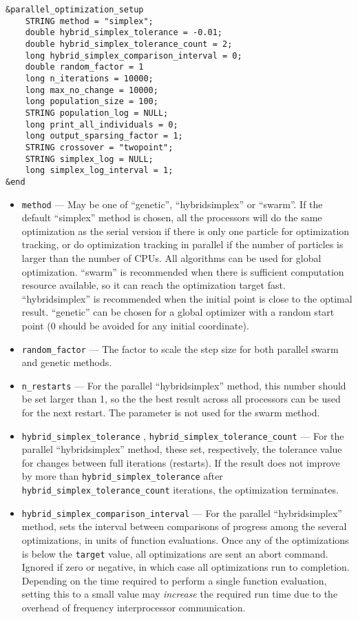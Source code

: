 \documentclass[11pt]{article}
\begin{document}
\begin{verbatim}
&parallel_optimization_setup
    STRING method = "simplex";
    double hybrid_simplex_tolerance = -0.01;
    double hybrid_simplex_tolerance_count = 2;
    long hybrid_simplex_comparison_interval = 0;
    double random_factor = 1
    long n_iterations = 10000;
    long max_no_change = 10000;
    long population_size = 100;
    STRING population_log = NULL;
    long print_all_individuals = 0;
    long output_sparsing_factor = 1;
    STRING crossover = "twopoint";
    STRING simplex_log = NULL;
    long simplex_log_interval = 1;
&end
\end{verbatim}

\begin{itemize}
\item \verb|method| --- May be one of ``genetic'', ``hybridsimplex'' or ``swarm''. If the default ``simplex'' method is chosen, all the processors will do the same optimization as the serial version if there is only one particle for optimization tracking, or do optimization tracking in parallel if the number of particles is larger than the number of CPUs. All algorithms can be used for global optimization. ``swarm'' is recommended when there is sufficient computation resource available, so it can reach the optimization target fast. ``hybridsimplex'' is recommended when the initial point is close to the optimal result. ``genetic'' can be chosen for a global optimizer with a random start point (0 should be avoided for any initial coordinate). 

\item \verb|random_factor| --- The factor to scale the step size for both parallel swarm and genetic methods.

\item \verb|n_restarts| --- For the parallel ``hybridsimplex'' method, this number should be set larger than 1, so the the best result across all processors can be used for the next restart. The parameter is not used for the swarm method.

\item \verb|hybrid_simplex_tolerance| , \verb|hybrid_simplex_tolerance_count| --- For the parallel ``hybridsimplex'' method,
  these set, respectively, the tolerance value for changes between full iterations (restarts). If the result does not improve by
  more than \verb|hybrid_simplex_tolerance| after \verb|hybrid_simplex_tolerance_count| iterations, the optimization terminates.

\item \verb|hybrid_simplex_comparison_interval| --- For the parallel ``hybridsimplex'' method, sets the interval between
  comparisons of progress among the several optimizations, in units of function evaluations. Once any of the optimizations
  is below the \verb|target| value, all optimizations are sent an abort command.
  Ignored if zero or negative, in which case all optimizations run to completion.
  Depending on the time required to perform a single function evaluation, setting this to a small value 
  may {\em increase} the required run time due to the overhead of frequency interprocessor communication.


\end{itemize}
\end{document}

